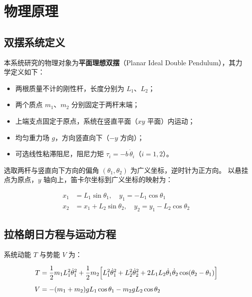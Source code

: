 \section{物理原理}

\subsection{双摆系统定义}

本系统研究的物理对象为\textbf{平面理想双摆}（Planar Ideal Double Pendulum），其力学定义如下：

\begin{itemize}
  \item 两根质量不计的刚性杆，长度分别为 $L_1$、$L_2$；
  \item 两个质点 $m_1$、$m_2$ 分别固定于两杆末端；
  \item 上端支点固定于原点，系统在竖直平面（$xy$ 平面）内运动；
  \item 均匀重力场 $g$，方向竖直向下（$-y$ 方向）；
  \item 可选线性粘滞阻尼，阻尼力矩 $\tau_i = -b\,\dot{\theta}_i$（$i = 1,2$）。
\end{itemize}

选取两杆与竖直向下方向的偏角 $(\theta_1, \theta_2)$ 为广义坐标，逆时针为正方向。
以悬挂点为原点，$y$ 轴向上，笛卡尔坐标到广义坐标的映射为：

\begin{equation}
\begin{aligned}
  x_1 &= L_1 \sin\theta_1, \quad y_1 = -L_1 \cos\theta_1 \\
  x_2 &= x_1 + L_2 \sin\theta_2, \quad y_2 = y_1 - L_2 \cos\theta_2
\end{aligned}
\label{eq:kinematics}
\end{equation}

\subsection{拉格朗日方程与运动方程}

系统动能 $T$ 与势能 $V$ 为：

\begin{equation}
\begin{aligned}
  T &= \frac{1}{2}m_1 L_1^2 \dot{\theta}_1^2
     + \frac{1}{2}m_2\Bigl[L_1^2\dot{\theta}_1^2 + L_2^2\dot{\theta}_2^2
     + 2L_1 L_2\dot{\theta}_1\dot{\theta}_2\cos(\theta_2-\theta_1)\Bigr] \\[0.5em]
  V &= -(m_1+m_2)gL_1\cos\theta_1 - m_2 g L_2 \cos\theta_2
\end{aligned}
\label{eq:energy}
\end{equation}

